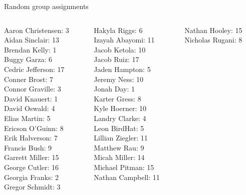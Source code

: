 \documentclass[10pt]{beamer}
\begin{document}
\begin{frame}{Random group assignments}
\footnotesize 
\vfill 
\begin{columns}
\begin{column}{0.33\textwidth}
Aaron Christensen: 3 \\ 
Aidan Sinclair: 13 \\ 
Brendan Kelly: 1 \\ 
Buggy Garza: 6 \\ 
Cedric Jefferson: 17 \\ 
Conner Brost: 7 \\ 
Connor Graville: 3 \\ 
David Knauert: 1 \\ 
David Oswald: 4 \\ 
Elias Martin: 5 \\ 
Ericson O'Guinn: 8 \\ 
Erik Halverson: 7 \\ 
Francis Bush: 9 \\ 
Garrett Miller: 15 \\ 
George Cutler: 16 \\ 
Georgia Franks: 2 \\ 
Gregor Schmidt: 3 \\\end{column}
\begin{column}{0.33\textwidth}
Hakyla Riggs: 6 \\ 
Izayah Abayomi: 11 \\ 
Jacob Ketola: 10 \\ 
Jacob Ruiz: 17 \\ 
Jaden Hampton: 5 \\ 
Jeremy Ness: 10 \\ 
Jonah Day: 1 \\ 
Karter Gress: 8 \\ 
Kyle Hoerner: 10 \\ 
Landry Clarke: 4 \\ 
Leon BirdHat: 5 \\ 
Lillian Ziegler: 11 \\ 
Matthew Rau: 9 \\ 
Micah Miller: 14 \\ 
Michael Pitman: 15 \\ 
Nathan Campbell: 11 \\\end{column}
\begin{column}{0.33\textwidth}
Nathan Hooley: 15 \\ 
Nicholas Rugani: 8 \\ 

\end{column}
\end{columns}
\end{frame}
\end{document}
